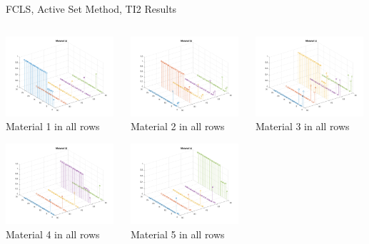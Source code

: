 \documentclass{beamer}
\begin{document}
\begin{frame}{FCLS, Active Set Method, TI2 Results}
\begin{columns}
    \begin{column}{0.33\textwidth}
        \includegraphics[width=4cm,center]{fcls_ti2_material_stem_1}
        \\ Material 1 in all rows
        \centering

        \includegraphics[width=4cm,center]{fcls_ti2_material_stem_4}
        \\ Material 4 in all rows
        \centering
    \end{column}
    \begin{column}{0.33\textwidth}
        \includegraphics[width=4cm,center]{fcls_ti2_material_stem_2}
        \\ Material 2 in all rows
        \centering

        \includegraphics[width=4cm,center]{fcls_ti2_material_stem_5}
        \\ Material 5 in all rows
        \centering
    \end{column}
    \begin{column}{0.33\textwidth}
        \includegraphics[width=4cm,center]{fcls_ti2_material_stem_3}
        \\ Material 3 in all rows
        \centering


\end{column}
\end{columns}
\end{frame}
\end{document}
